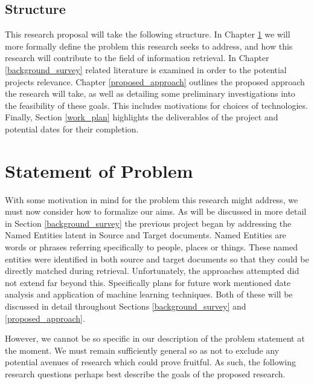 \documentclass{mprop}
\begin{document}
\subsection{Structure}
This research proposal will take the following structure. In Chapter \ref{problem_statement} we will more formally define the problem this research seeks to address, and how this research will contribute to the field of information retrieval. In Chapter \ref{background_survey} related literature is examined in order to  the potential projects relevance. Chapter \ref{proposed_approach} outlines the proposed approach the research will take, as well as detailing some preliminary investigations into the feasibility of these goals. This includes motivations for choices of technologies. Finally, Section \ref{work_plan} highlights the deliverables of the project and potential dates for their completion.

\section{Statement of Problem}\label{problem_statement}
With some motivation in mind for the problem this research might address, we must now consider how to formalize our aims. As will be discussed in more detail in Section \ref{background_survey} the previous project began by addressing the Named Entities latent in Source and Target documents. Named Entities are words or phrases referring specifically to people, places or things. These named entities were identified in both source and target documents so that they could be directly matched during retrieval. Unfortunately, the approaches attempted did not extend far beyond this. Specifically plans for future work mentioned date analysis and application of machine learning techniques. Both of these will be discussed in detail throughout Sections \ref{background_survey} and \ref{proposed_approach}.

However, we cannot be so specific in our description of the problem statement at the moment. We must remain sufficiently general so as not to exclude any potential avenues of research which could prove fruitful. As such, the following research questions perhaps best describe the goals of the proposed research.
\end{document}
